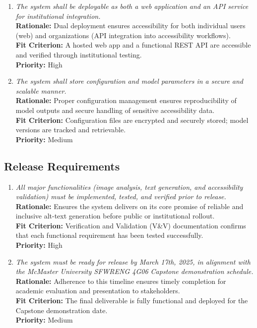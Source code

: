 \documentclass[12pt]{article}
\begin{document}
\begin{enumerate}[label=OER-PR\arabic*., wide=0pt, leftmargin=*]
  \item \emph{The system shall be deployable as both a web application and an API service for institutional integration.}\\[2mm]
    {\bf Rationale:} Dual deployment ensures accessibility for both individual users (web) and organizations (API integration into accessibility workflows).\\
    {\bf Fit Criterion:} A hosted web app and a functional REST API are accessible and verified through institutional testing.\\
    {\bf Priority:} High

  \item \emph{The system shall store configuration and model parameters in a secure and scalable manner.}\\[2mm]
    {\bf Rationale:} Proper configuration management ensures reproducibility of model outputs and secure handling of sensitive accessibility data.\\
    {\bf Fit Criterion:} Configuration files are encrypted and securely stored; model versions are tracked and retrievable.\\
    {\bf Priority:} Medium
\end{enumerate}

\subsection{Release Requirements}

\begin{enumerate}[label=OER-RL\arabic*., wide=0pt, leftmargin=*]
  \item \emph{All major functionalities (image analysis, text generation, and accessibility validation) must be implemented, tested, and verified prior to release.}\\[2mm]
    {\bf Rationale:} Ensures the system delivers on its core promise of reliable and inclusive alt-text generation before public or institutional rollout.\\
    {\bf Fit Criterion:} Verification and Validation (V\&V) documentation confirms that each functional requirement has been tested successfully.\\
    {\bf Priority:} High

  \item \emph{The system must be ready for release by March 17th, 2025, in alignment with the McMaster University SFWRENG 4G06 Capstone demonstration schedule.}\\[2mm]
    {\bf Rationale:} Adherence to this timeline ensures timely completion for academic evaluation and presentation to stakeholders.\\
    {\bf Fit Criterion:} The final deliverable is fully functional and deployed for the Capstone demonstration date.\\
    {\bf Priority:} Medium
\end{enumerate}
\end{document}

